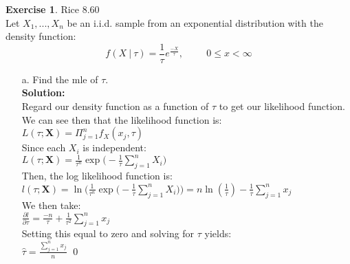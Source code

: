 \documentclass[11pt]{article}
\theoremstyle{definition}
\newtheorem{exercise}[theorem]{Exercise}
\newcommand{\st}{\ |\ }
\newcommand{\V}{\vspace{0.3cm}\\}
\newcommand{\sol}{\V \textbf{Solution:} \V}
\begin{document}
\begin{exercise} Rice 8.60\\
Let $X_1,...,X_n$ be an i.i.d. sample from an exponential distribution with the density function:
$$f(X\st\tau) = \frac{1}{\tau}e^{\frac{-X}{\tau}}, \hspace{1cm} 0\leq x < \infty$$
\begin{enumerate}
\item[a.] Find the mle of $\tau$. \sol
Regard our density function as a function of $\tau$ to get our likelihood function. We can see then that the likelihood function is:\V
$\displaystyle L(\tau; \textbf{X}) = \Pi_{j=1}^n f_X(x_j, \tau)$ \V
Since each $X_i$ is independent:\\
$\displaystyle L(\tau; \textbf{X}) = \frac{1}{\tau^n} \exp\bigg(-\frac{1}{\tau}\sum_{j=1}^n X_i\bigg)$ \V
 Then, the log likelihood function is: \V
$l(\tau; \textbf{X}) = \ln\bigg(\frac{1}{\tau^n} \exp\Big(-\frac{1}{\tau}\sum_{j=1}^n X_i\Big)\bigg) = n\ln(\frac{1}{\tau}) - \frac{1}{\tau}\sum_{j=1}^n x_j$ \V
We then take: \\
$\displaystyle \frac{\partial l}{\partial \tau} = \frac{-n}{\tau} + \frac{1}{\tau^2} \sum_{j=1}^n x_j$\V
Setting this equal to zero and solving for $\tau$ yields:\V
$\displaystyle \hat{\tau} = \frac{\sum_{j=1}^n x_j}{n}$ \qed


\end{enumerate}
\end{exercise}
\end{document}
